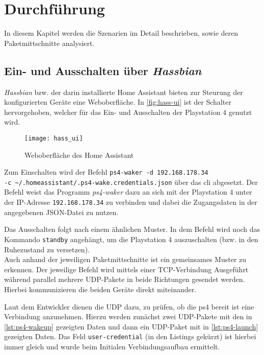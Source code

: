 \section{Durchführung}\label{sec:durchfuehrung}
In diesem Kapitel werden die Szenarien im Detail beschrieben, sowie deren Paketmittschnitte analysiert.

\subsection{Ein- und Ausschalten über \textit{Hassbian}}
\textit{Hassbian} bzw. der darin installierte Home Assistant bieten zur Steurung der konfigurierten Geräte eine Weboberfläche.
In \autoref{fig:hass-ui} ist der Schalter hervorgehoben, welcher für das Ein- und Ausschalten der Playstation 4 genutzt wird.

\begin{figure}[h!]
    \centering
    \texttt{[image: hass\_ui]}
    \caption{Weboberfläche des Home Assistant}\label{fig:hass-ui}
\end{figure}


Zum Einschalten wird der Befehl \texttt{ps4-waker -d 192.168.178.34 \\ -c \textasciitilde{}/.homeassistant/.ps4-wake.credentials.json} über das \ac{cli} abgesetzt.
Der Befehl weist das Programm \textit{ps4-waker} dazu an sich mit der Playstation 4 unter der IP-Adresse \texttt{192.168.178.34} zu verbinden und dabei die Zugangsdaten in der angegebenen JSON-Datei zu nutzen.

Das Ausschalten folgt nach einem ähnlichen Muster.
In dem Befehl wird noch das Kommando \texttt{standby} angehängt,
um die Playstation 4 auszuschalten (bzw. in den Ruhezustand zu versetzen). \\

Auch anhand der jeweiligen Paketmittschnitte ist ein gemeinsames Muster zu erkennen.
Der jeweilige Befehl wird mittels einer TCP-Verbindung Ausgeführt
während parallel mehrere UDP-Pakete in beide Richtungen gesendet werden.
Hierbei kommunizieren die beiden Geräte direkt miteinander.

Laut dem Entwickler dienen die UDP dazu, zu prüfen, ob die \ac{ps4} bereit ist eine Verbindung anzunehmen.
Hierzu werden zunächst zwei UDP-Pakete mit den in \autoref{lst:ps4-wakeup} gezeigten Daten
und dann ein UDP-Paket mit in \autoref{lst:ps4-launch} gezeigten Daten.
Das Feld \texttt{user-credential} (in den Listings gekürzt) ist hierbei immer gleich
und wurde beim Initialen Verbindungsaufbau ermittelt.

